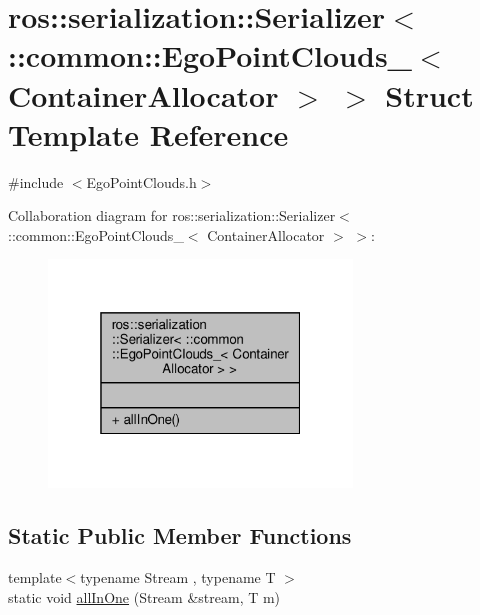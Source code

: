 \hypertarget{structros_1_1serialization_1_1Serializer_3_01_1_1common_1_1EgoPointClouds___3_01ContainerAllocator_01_4_01_4}{}\section{ros\+:\+:serialization\+:\+:Serializer$<$ \+:\+:common\+:\+:Ego\+Point\+Clouds\+\_\+$<$ Container\+Allocator $>$ $>$ Struct Template Reference}
\label{structros_1_1serialization_1_1Serializer_3_01_1_1common_1_1EgoPointClouds___3_01ContainerAllocator_01_4_01_4}


{\ttfamily \#include $<$Ego\+Point\+Clouds.\+h$>$}



Collaboration diagram for ros\+:\+:serialization\+:\+:Serializer$<$ \+:\+:common\+:\+:Ego\+Point\+Clouds\+\_\+$<$ Container\+Allocator $>$ $>$\+:\nopagebreak
\begin{figure}[H]
\begin{center}
\leavevmode
\includegraphics[width=229pt]{d5/da1/structros_1_1serialization_1_1Serializer_3_01_1_1common_1_1EgoPointClouds___3_01ContainerAllocator_01_4_01_4__coll__graph}
\end{center}
\end{figure}
\subsection*{Static Public Member Functions}
\begin{DoxyCompactItemize}
\item 
{\footnotesize template$<$typename Stream , typename T $>$ }\\static void \hyperlink{structros_1_1serialization_1_1Serializer_3_01_1_1common_1_1EgoPointClouds___3_01ContainerAllocator_01_4_01_4_a1cc360a582bdaaa1653f226a214b7665}{all\+In\+One} (Stream \&stream, T m)
\end{DoxyCompactItemize}


